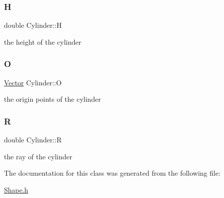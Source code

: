 \subsubsection{\texorpdfstring{H}{H}}
{\footnotesize\ttfamily double Cylinder\+::H}

the height of the cylinder \mbox{\label{classCylinder_a3093b8b66a4194d086cbb6cf700bc32a}} 
\subsubsection{\texorpdfstring{O}{O}}
{\footnotesize\ttfamily \hyperlink{classVector}{Vector} Cylinder\+::O}

the origin points of the cylinder \mbox{\label{classCylinder_a8f4587554355f2a79614f639034f8aaf}} 
\subsubsection{\texorpdfstring{R}{R}}
{\footnotesize\ttfamily double Cylinder\+::R}

the ray of the cylinder 

The documentation for this class was generated from the following file\+:\begin{DoxyCompactItemize}
\item 
\hyperlink{Shape_8h}{Shape.\+h}\end{DoxyCompactItemize}
